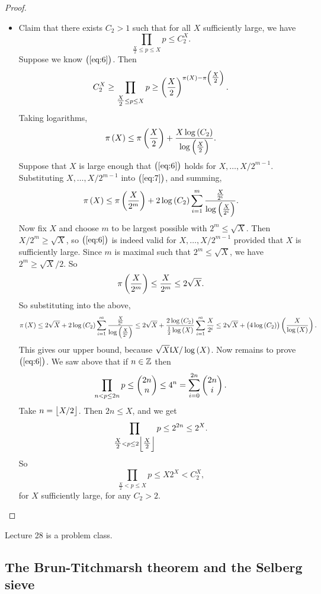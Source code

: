 \begin{proof}
\begin{itemize}
\pagebreak

\item Claim that there exists $ C_2 > 1 $ such that for all $ X $ sufficiently large, we have
\begin{equation}
\label{eq:6}
\prod_{\tfrac{X}{2} \le p \le X} p \le C_2^X.
\end{equation}
Suppose we know $ \br{\ref{eq:6}} $. Then
$$ C_2^X \ge \prod_{\tfrac{X}{2} \le p \le X} p \ge \br{\dfrac{X}{2}}^{\pi\br{X} - \pi\br{\tfrac{X}{2}}}. $$
Taking logarithms,
\begin{equation}
\label{eq:7}
\pi\br{X} \le \pi\br{\dfrac{X}{2}} + \dfrac{X\log\br{C_2}}{\log\br{\tfrac{X}{2}}}.
\end{equation}
Suppose that $ X $ is large enough that $ \br{\ref{eq:6}} $ holds for $ X, \dots, X / 2^{m - 1} $. Substituting $ X, \dots, X / 2^{m - 1} $ into $ \br{\ref{eq:7}} $, and summing,
$$ \pi\br{X} \le \pi\br{\dfrac{X}{2^m}} + 2\log\br{C_2}\sum_{i = 1}^m \dfrac{\tfrac{X}{2^i}}{\log\br{\tfrac{X}{2^i}}}. $$
Now fix $ X $ and choose $ m $ to be largest possible with $ 2^m \le \sqrt{X} $. Then $ X / 2^m \ge \sqrt{X} $, so $ \br{\ref{eq:6}} $ is indeed valid for $ X, \dots, X / 2^{m - 1} $ provided that $ X $ is sufficiently large. Since $ m $ is maximal such that $ 2^m \le \sqrt{X} $, we have $ 2^m \ge \sqrt{X} / 2 $. So
$$ \pi\br{\dfrac{X}{2^m}} \le \dfrac{X}{2^m} \le 2\sqrt{X}. $$
So substituting into the above,
$$ \pi\br{X} \le 2\sqrt{X} + 2\log\br{C_2}\sum_{i = 1}^m \dfrac{\tfrac{X}{2^i}}{\log\br{\tfrac{X}{2^i}}} \le 2\sqrt{X} + \dfrac{2\log\br{C_2}}{\tfrac{1}{2}\log\br{X}}\sum_{i = 1}^m \dfrac{X}{2^i} \le 2\sqrt{X} + \br{4\log\br{C_2}}\br{\dfrac{X}{\log\br{X}}}. $$
This gives our upper bound, because $ \sqrt{X} \l X / \log\br{X} $. Now remains to prove $ \br{\ref{eq:6}} $. We saw above that if $ n \in \mathbb{Z} $ then
$$ \prod_{n < p \le 2n} p \le \begin{pmatrix} 2n \\ n \end{pmatrix} \le 4^n = \sum_{i = 0}^{2n} \begin{pmatrix} 2n \\ i \end{pmatrix}. $$
Take $ n = \left\lfloor X / 2 \right\rfloor $. Then $ 2n \le X $, and we get
$$ \prod_{\tfrac{X}{2} < p \le 2\left\lfloor \tfrac{X}{2} \right\rfloor} p \le 2^{2n} \le 2^X. $$
So
$$ \prod_{\tfrac{X}{2} < p \le X} p \le X2^X < C_2^X, $$
for $ X $ sufficiently large, for any $ C_2 > 2 $.
\end{itemize}
\end{proof}


Lecture 28 is a problem class.

\pagebreak

\subsection{The Brun-Titchmarsh theorem and the Selberg sieve}

